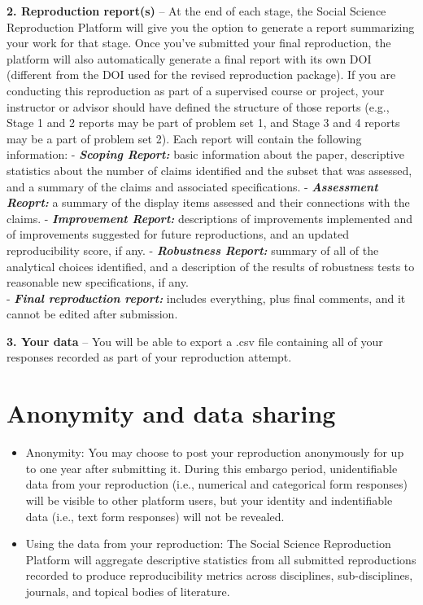 \documentclass[]{book}
\begin{document}
\textbf{2. Reproduction report(s)} -- At the end of each stage, the Social Science Reproduction Platform will give you the option to generate a report summarizing your work for that stage. Once you've submitted your final reproduction, the platform will also automatically generate a final report with its own DOI (different from the DOI used for the revised reproduction package). If you are conducting this reproduction as part of a supervised course or project, your instructor or advisor should have defined the structure of those reports (e.g., Stage 1 and 2 reports may be part of problem set 1, and Stage 3 and 4 reports may be a part of problem set 2). Each report will contain the following information:
- \textbf{\emph{Scoping Report:}} basic information about the paper, descriptive statistics about the number of claims identified and the subset that was assessed, and a summary of the claims and associated specifications.
- \textbf{\emph{Assessment Reoprt:}} a summary of the display items assessed and their connections with the claims.
- \textbf{\emph{Improvement Report:}} descriptions of improvements implemented and of improvements suggested for future reproductions, and an updated reproducibility score, if any.
- \textbf{\emph{Robustness Report:}} summary of all of the analytical choices identified, and a description of the results of robustness tests to reasonable new specifications, if any.\\
- \textbf{\emph{Final reproduction report:}} includes everything, plus final comments, and it cannot be edited after submission.

\textbf{3. Your data} -- You will be able to export a .csv file containing all of your responses recorded as part of your reproduction attempt.

\hypertarget{anonymity-and-data-sharing}{%
\section{Anonymity and data sharing}\label{anonymity-and-data-sharing}}

\begin{itemize}
\item
  Anonymity: You may choose to post your reproduction anonymously for up to one year after submitting it. During this embargo period, unidentifiable data from your reproduction (i.e., numerical and categorical form responses) will be visible to other platform users, but your identity and indentifiable data (i.e., text form responses) will not be revealed.
\item
  Using the data from your reproduction: The Social Science Reproduction Platform will aggregate descriptive statistics from all submitted reproductions recorded to produce reproducibility metrics across disciplines, sub-disciplines, journals, and topical bodies of literature.
\end{itemize}
\end{document}
